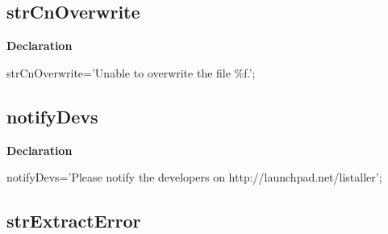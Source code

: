 \documentclass{report}
\newif\ifpdf
\begin{document}
\subsection*{strCnOverwrite}
\fi
\label{trstrings-strCnOverwrite}
\begin{list}{}{
\setlength{\itemindent}{0cm}
\setlength{\listparindent}{0cm}
\setlength{\leftmargin}{\evensidemargin}
\addtolength{\leftmargin}{\tmplength}
\settowidth{\labelsep}{X}
\addtolength{\leftmargin}{\labelsep}
\setlength{\labelwidth}{\tmplength}
}
\item[\textbf{Declaration}\hfill]
\ifpdf
\begin{flushleft}
\fi
\begin{ttfamily}
strCnOverwrite='Unable to overwrite the file {\%}f.';\end{ttfamily}

\ifpdf
\end{flushleft}
\fi

\end{list}
\ifpdf
\subsection*{\large{\textbf{notifyDevs}}\normalsize\hspace{1ex}\hrulefill}
\else
\subsection*{notifyDevs}
\fi
\label{trstrings-notifyDevs}
\begin{list}{}{
\setlength{\itemindent}{0cm}
\setlength{\listparindent}{0cm}
\setlength{\leftmargin}{\evensidemargin}
\addtolength{\leftmargin}{\tmplength}
\settowidth{\labelsep}{X}
\addtolength{\leftmargin}{\labelsep}
\setlength{\labelwidth}{\tmplength}
}
\item[\textbf{Declaration}\hfill]
\ifpdf
\begin{flushleft}
\fi
\begin{ttfamily}
notifyDevs='Please notify the developers on http://launchpad.net/listaller';\end{ttfamily}

\ifpdf
\end{flushleft}
\fi

\end{list}
\ifpdf
\subsection*{\large{\textbf{strExtractError}}\normalsize\hspace{1ex}\hrulefill}
\else
\end{document}
